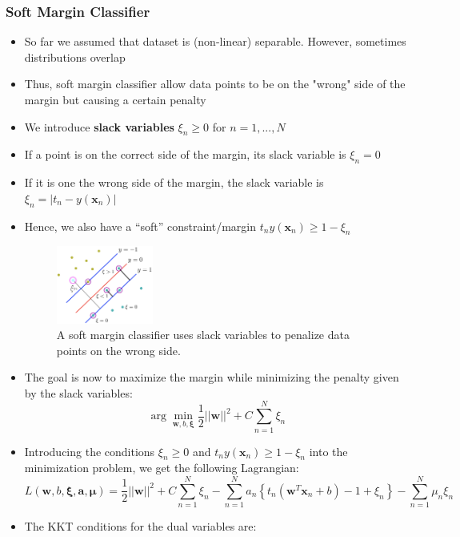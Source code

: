 \subsubsection{Soft Margin Classifier}
\begin{itemize}
	\item So far we assumed that dataset is (non-linear) separable. However, sometimes distributions overlap 
	\item Thus, soft margin classifier allow data points to be on the "wrong" side of the margin but causing a certain penalty
	\item We introduce \textbf{slack variables} $\xi_n\geq 0$ for $n=1,...,N$
	\item If a point is on the correct side of the margin, its slack variable is $\xi_n = 0$
	\item If it is one the wrong side of the margin, the slack variable is $\xi_n = |t_n - y(\bm{x}_n)|$
	\item Hence, we also have a ``soft'' constraint/margin $t_n y(\bm{x}_n)\geq 1 - \xi_n$
	\begin{figure}[ht]
		\centering
		\includegraphics[width=0.3\textwidth]{figures/svm_soft_margin.png}
		\caption{A soft margin classifier uses slack variables to penalize data points on the wrong side.}
		\label{img:svm_soft_margin}
	\end{figure}
	\item The goal is now to maximize the margin while minimizing the penalty given by the slack variables:
	$$\arg\min_{\bm{w},b,\bm{\xi}} \frac{1}{2} ||\bm{w}||^2 + C\sum\limits_{n=1}^{N} \xi_n$$
	\item Introducing the conditions $\xi_n\geq 0$ and $t_n y(\bm{x}_n)\geq 1 - \xi_n$ into the minimization problem, we get the following Lagrangian:
	$$L\left(\bm{w}, b, \bm{\xi}, \bm{a}, \bm{\mu}\right) = \frac{1}{2} ||\bm{w}||^2 +C \sum\limits_{n=1}^{N} \xi_n - \sum\limits_{n=1}^{N} a_n \left\{t_n \left(\bm{w}^T \bm{x}_n + b\right) - 1 + \xi_n \right\} - \sum\limits_{n=1}^{N} \mu_n \xi_n $$
	\item The KKT conditions for the dual variables are:
	\begin{equation*}
		\begin{split}

\end{split}
\end{equation*}
\end{itemize}
